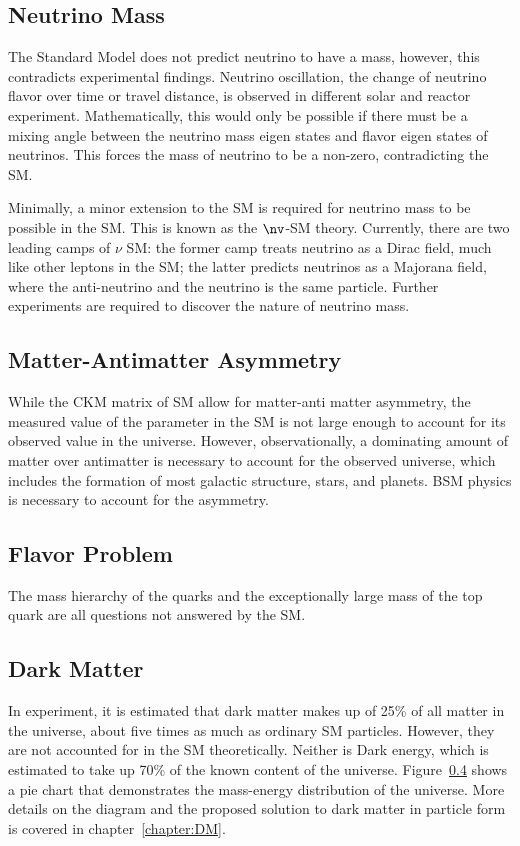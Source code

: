 \subsection{Neutrino Mass}
The Standard Model does not predict neutrino to have a mass, however, this contradicts experimental findings. Neutrino oscillation, the change of neutrino flavor over time or travel distance, is observed in different solar and reactor experiment. Mathematically, this would only be possible if there must be a mixing angle between the neutrino mass eigen states and flavor eigen states of neutrinos. This forces the mass of neutrino to be a non-zero, contradicting the SM.

Minimally, a minor extension to the SM is required for neutrino mass to be possible in the SM. This is known as the $\nv$-SM theory. Currently, there are two leading camps of $\nu$ SM: the former camp treats neutrino as a Dirac field, much like other leptons in the SM; the latter predicts neutrinos as a Majorana field, where the anti-neutrino and the neutrino is the same particle. Further experiments are required to discover the nature of neutrino mass. 



\subsection{Matter-Antimatter Asymmetry}
While the CKM matrix of SM allow for matter-anti matter asymmetry, the measured value of the parameter in the SM is not large enough to account for its observed value in the universe. However, observationally, a dominating amount of matter over antimatter is necessary to account for the observed universe, which includes the formation of most galactic structure, stars, and planets. BSM physics is necessary to account for the asymmetry. 

\subsection{Flavor Problem}
The mass hierarchy of the quarks and the exceptionally large mass of the top quark are all questions not answered by the SM.

\subsection{Dark Matter}
In experiment, it is estimated that dark matter makes up of 25\% of all matter in the universe, about five times as much as ordinary SM particles. However, they are not accounted for in the SM theoretically.
Neither is Dark energy, which is estimated to take up 70\% of the known content of the universe. Figure~\ref{} shows a pie chart that demonstrates the mass-energy distribution of the universe. More details on the diagram and the proposed solution to dark matter in particle form is covered in chapter~\ref{chapter:DM}.


